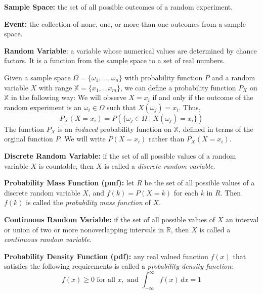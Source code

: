\begin{definition}
	\textbf{Sample Space:} the set of all possible outcomes of a random experiment.
\end{definition}

\begin{definition}
	\textbf{Event:} the collection of none, one, or more than one outcomes from a sample space.
\end{definition}

\begin{definition}
	\textbf{Random Variable}: a variable whose numerical values are determined by chance factors. It is a function from the sample space to a set of real numbers.
\end{definition}

Given a sample space $\Omega = \{ \omega_1, \ldots, \omega_n \}$ with probability function $P$ and a random variable $X$ with range $\mathbb{X} = \{ x_1, \ldots x_m \}$, we can define a probability function $P_X$ on $\mathbb{X}$ in the following way: We will observe $X = x_i$ if and only if the outcome of the random experiment is an $\omega_i \in \Omega$ such that $X(\omega_j) = x_i$. Thus,
\[
	P_X(X = x_i) = P(\{ \omega_j \in \Omega \mid X(\omega_j) = x_i \})
\]
The function $P_X$ is an \textit{induced} probability function on $\mathbb{X}$, defined in terms of the orginal function $P$. We will write $P(X = x_i)$ rather than $P_X(X = x_i)$.
\begin{definition}
	\textbf{Discrete Random Variable:} if the set of all possible values of a random variable $X$ is countable, then $X$ is called a \textit{discrete random variable}.
\end{definition}

\begin{definition}
	\textbf{Probability Mass Function (pmf):} let $R$ be the set of all possible values of a discrete random variable $X$, and $f(k) = P(X = k)$ for each $k$ in $R$. Then $f(k)$ is called the \textit{probability mass function} of $X$.
\end{definition}

\begin{definition}
	\textbf{Continuous Random Variable:} if the set of all possible values of $X$ an interval or union of two or more nonoverlapping intervals in $\mathbb{R}$, then $X$ is called a \textit{continuous random variable}.
\end{definition}

\begin{definition}
	\textbf{Probability Density Function (pdf):} any real valued function $f(x)$ that satisfies the following requirements is called a \textit{probability density function}:
	\[
		f(x) \geq 0 \text{ for all } x, \text{ and } \int_{-\infty}^{\infty}f(x)\,dx = 1
	\]
\end{definition}


